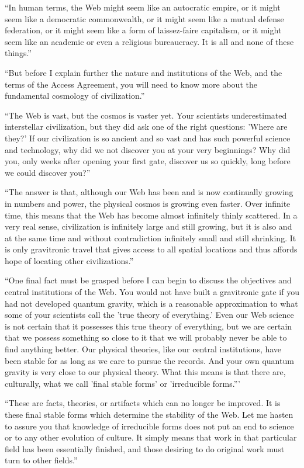 \documentclass[english,11pt,letterpaper,onecolumn]{scrbook}
\begin{document}
	``In human terms, the Web might seem like an autocratic empire, or it might seem like a democratic commonwealth, or it might seem like a mutual defense federation, or it might seem like a form of laissez-faire capitalism, or it might seem like an academic or even a religious bureaucracy.  It is all and none of these things.''
	
	``But before I explain further the nature and institutions of the Web, and the terms of the Access Agreement, you will need to know more about the fundamental cosmology of civilization.''
	
	``The Web is vast, but the cosmos is vaster yet.  Your scientists underestimated interstellar civilization, but they did ask one of the right questions:  'Where are they?'  If our civilization is so ancient and so vast and has such powerful science and technology, why did we not discover you at your very beginnings?  Why did you, only weeks after opening your first gate, discover us so quickly, long before we could discover you?''
	
	``The answer is that, although our Web has been and is now continually growing in numbers and power, the physical cosmos is growing even faster.  Over infinite time, this means that the Web has become almost infinitely thinly scattered.  In a very real sense, civilization is infinitely large and still growing, but it is also and at the same time and without contradiction infinitely small and still shrinking.  It is only gravitronic travel that gives access to all spatial locations and thus affords hope of locating other civilizations.''
	
	``One final fact must be grasped before I can begin to discuss the objectives and central institutions of the Web.  You would not have built a gravitronic gate if you had not developed quantum gravity, which is a reasonable approximation to what some of your scientists call the 'true theory of everything.'  Even our Web science is not certain that it possesses this true theory of everything, but we are certain that we possess something so close to it that we will probably never be able to find anything better.  Our physical theories, like our central institutions, have been stable for as long as we care to pursue the records.  And your own quantum gravity is very close to our physical theory.  What this means is that there are, culturally, what we call 'final stable forms' or 'irreducible forms.'''
	
	``These are facts, theories, or artifacts which can no longer be improved.  It is these final stable forms which determine the stability of the Web.  Let me hasten to assure you that knowledge of irreducible forms does not put an end to science or to any other evolution of culture.  It simply means that work in that particular field has been essentially finished, and those desiring to do original work must turn to other fields.''
	
\end{document}
